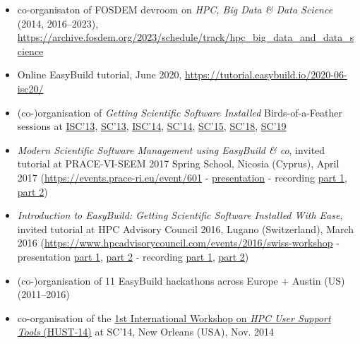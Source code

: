 \begin{itemize}
\item[] co-organisaton of FOSDEM devroom on \emph{HPC, Big Data \& Data Science} (2014, 2016--2023),
    \url{https://archive.fosdem.org/2023/schedule/track/hpc_big_data_and_data_science}
\item[] Online EasyBuild tutorial, June 2020, \url{https://tutorial.easybuild.io/2020-06-isc20/}
\item[] (co-)organisation of \emph{Getting Scientific Software Installed} Birds-of-a-Feather sessions at \href{http://2013.isc-hpc.com/isc13_ap/presentationdetails.php?t=contribution&o=2108&a=select&ra=eventdetails}{ISC'13}, \href{https://github.com/easybuilders/easybuild/wiki/SC13-BoF-session}{SC'13}, \href{https://github.com/easybuilders/easybuild/wiki/ISC'14-BoF-session}{ISC'14}, \href{https://github.com/easybuilders/easybuild/wiki/SC14-BoF-session}{SC'14}, \href{https://github.com/easybuilders/easybuild/wiki/SC15-BoF-session}{SC'15}, \href{https://github.com/easybuilders/easybuild/wiki/SC18-BoF-session-Getting-Scientific-Software-Installed}{SC'18}, \href{https://github.com/easybuilders/easybuild/wiki/SC19-BoF-session-Getting-Scientific-Software-Installed}{SC'19}
\item[] \emph{Modern Scientific Software Management using EasyBuild \& co}, invited tutorial at PRACE-VI-SEEM	2017 Spring School, Nicosia (Cyprus), April 2017 (\url{https://events.prace-ri.eu/event/601} - \href{https://users.ugent.be/~kehoste/EasyBuild_20170425_PRACE_Spring_School.pdf}{presentation} - recording \href{https://www.youtube.com/watch?v=5WNcTHRyDxk}{part 1}, \href{https://www.youtube.com/watch?v=fiv_p87w9XM}{part 2})
\item[] \emph{Introduction to EasyBuild: Getting Scientific Software Installed With Ease}, invited tutorial at HPC Advisory Council 2016, Lugano (Switzerland), March 2016 (\url{https://www.hpcadvisorycouncil.com/events/2016/swiss-workshop} - presentation \href{https://users.ugent.be/~kehoste/EasyBuild_HPCAC_intro_20160323.pdf}{part 1}, \href{https://users.ugent.be/~kehoste/EasyBuild_HPCAC_start_20160323.pdf}{part 2} - recording \href{https://www.youtube.com/watch?v=cL_UcPIIxzE}{part 1},  \href{https://www.youtube.com/watch?v=yo_KwlDtg0w}{part 2})
\item[] (co-)organisation of 11 EasyBuild hackathons across Europe + Austin (US) (2011--2016)
\item[] co-organisation of the \href{http://sc14.supercomputing.org/schedule/event_detail-evid=wksp152.html}{1st International Workshop on \emph{HPC User Support Tools} (HUST-14)} at SC'14, New Orleans (USA), Nov. 2014

\end{itemize}

